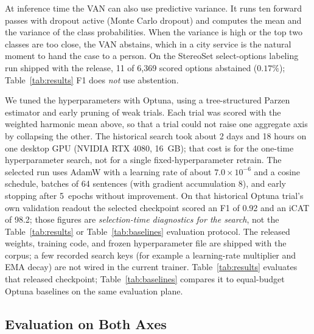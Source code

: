 \documentclass{IEEEcsmag}
\begin{document}
At inference time the VAN can also use predictive variance. It runs ten forward passes with dropout active (Monte Carlo dropout) and computes the mean and the variance of the class probabilities. When the variance is high or the top two classes are too close, the VAN abstains, which in a city service is the natural moment to hand the case to a person. On the StereoSet select-options labeling run shipped with the release, 11 of 6{,}369 scored options abstained ($0.17\%$); Table~\ref{tab:results} F1 does \emph{not} use abstention.

We tuned the hyperparameters with Optuna,\cite{akiba2019} using a tree-structured Parzen estimator and early pruning of weak trials. Each trial was scored with the weighted harmonic mean above, so that a trial could not raise one aggregate axis by collapsing the other. The historical search took about 2 days and 18 hours on one desktop GPU (NVIDIA RTX 4080, 16~GB); that cost is for the one-time hyperparameter search, not for a single fixed-hyperparameter retrain. The selected run uses AdamW with a learning rate of about $7.0\times10^{-6}$ and a cosine schedule, batches of 64 sentences (with gradient accumulation 8), and early stopping after 5~epochs without improvement. On that historical Optuna trial's own validation readout the selected checkpoint scored an F1 of 0.92 and an iCAT of 98.2; those figures are \emph{selection-time diagnostics for the search}, not the Table~\ref{tab:results} or Table~\ref{tab:baselines} evaluation protocol. The released weights, training code, and frozen hyperparameter file are shipped with the corpus; a few recorded search keys (for example a learning-rate multiplier and EMA decay) are not wired in the current trainer. Table~\ref{tab:results} evaluates that released checkpoint; Table~\ref{tab:baselines} compares it to equal-budget Optuna baselines on the same evaluation plane.

\subsection{Evaluation on Both Axes}
\end{document}
